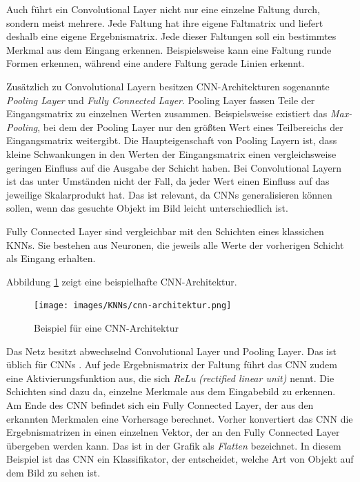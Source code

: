 Auch führt ein Convolutional Layer nicht nur eine einzelne Faltung durch, sondern meist mehrere. Jede Faltung hat ihre eigene Faltmatrix und liefert deshalb eine eigene Ergebnismatrix. Jede dieser Faltungen soll ein bestimmtes Merkmal aus dem Eingang erkennen. Beispielsweise kann eine Faltung runde Formen erkennen, während eine andere Faltung gerade Linien erkennt. 

Zusätzlich zu Convolutional Layern besitzen \ac{CNN}-Architekturen sogenannte \emph{Pooling Layer} und \emph{Fully Connected Layer}. Pooling Layer fassen Teile der Eingangsmatrix zu einzelnen Werten zusammen. Beispielsweise existiert das \emph{Max-Pooling}, bei dem der Pooling Layer nur den größten Wert eines Teilbereichs der Eingangsmatrix weitergibt. Die Haupteigenschaft von Pooling Layern ist, dass kleine Schwankungen in den Werten der Eingangsmatrix einen vergleichsweise geringen Einfluss auf die Ausgabe der Schicht haben. Bei Convolutional Layern ist das unter Umständen nicht der Fall, da jeder Wert einen Einfluss auf das jeweilige Skalarprodukt hat. Das ist relevant, da \acp{CNN} generalisieren können sollen, wenn das gesuchte Objekt im Bild leicht unterschiedlich ist. \cite{DeepLearningBook}

Fully Connected Layer sind vergleichbar mit den Schichten eines klassichen \acp{KNN}. Sie bestehen aus Neuronen, die jeweils alle Werte der vorherigen Schicht als Eingang erhalten. \cite{DeepLearningBook}

Abbildung \ref{fig:cnn-architecture} zeigt eine beispielhafte \ac{CNN}-Architektur. 
\begin{figure}[h]
   \centering
   \texttt{[image: images/KNNs/cnn-architektur.png]}
   \caption{Beispiel für eine \ac{CNN}-Architektur \emph{\cite{cnn-architektur-img}}}
   \label{fig:cnn-architecture}
\end{figure}
Das Netz besitzt abwechselnd Convolutional Layer und Pooling Layer. Das ist üblich für \acp{CNN} \cite{DeepLearningBook}. Auf jede Ergebnismatrix der Faltung führt das \ac{CNN} zudem eine Aktivierungsfunktion aus, die sich \emph{ReLu} \emph{(rectified linear unit)} nennt. Die Schichten sind dazu da, einzelne Merkmale aus dem Eingabebild zu erkennen. Am Ende des \ac{CNN} befindet sich ein Fully Connected Layer, der aus den erkannten Merkmalen eine Vorhersage berechnet. Vorher konvertiert das \ac{CNN} die Ergebnismatrizen in einen einzelnen Vektor, der an den Fully Connected Layer übergeben werden kann. Das ist in der Grafik als \emph{Flatten} bezeichnet. In diesem Beispiel ist das \ac{CNN} ein Klassifikator, der entscheidet, welche Art von Objekt auf dem Bild zu sehen ist.